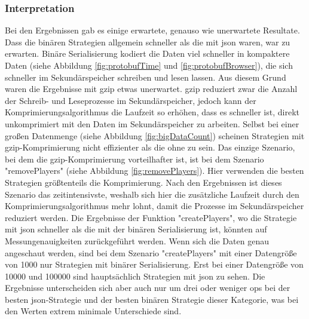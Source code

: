 \subsubsection{Interpretation}
Bei den Ergebnissen gab es einige erwartete, genauso wie unerwartete Resultate. Dass die binären Strategien allgemein schneller als die mit \ac{json} waren, war zu erwarten. Binäre Serialisierung kodiert die Daten viel schneller in kompaktere Daten (siehe Abbildung \ref{fig:protobufTime} und \ref{fig:protobufBrowser}), die sich schneller im Sekundärspeicher schreiben und lesen lassen. Aus diesem Grund waren die Ergebnisse mit \ac{gzip} etwas unerwartet. \ac{gzip} reduziert zwar die Anzahl der Schreib- und Leseprozesse im Sekundärspeicher, jedoch kann der Komprimierungsalgorithmus die Laufzeit so erhöhen, dass es schneller ist, direkt unkomprimiert mit den Daten im Sekundärspeicher zu arbeiten. Selbst bei einer großen Datenmenge (siehe Abbildung \ref{fig:bigDataCount}) scheinen Strategien mit \ac{gzip}-Komprimierung nicht effizienter als die ohne zu sein. Das einzige Szenario, bei dem die \ac{gzip}-Komprimierung vorteilhafter ist, ist bei dem Szenario "removePlayers" (siehe Abbildung \ref{fig:removePlayers}). Hier verwenden die besten Strategien größtenteils die Komprimierung. Nach den Ergebnissen ist dieses Szenario das zeitintensivste, weshalb sich hier die zusätzliche Laufzeit durch den Komprimierungsalgorithmus mehr lohnt, damit die Prozesse im Sekundärspeicher reduziert werden. Die Ergebnisse der Funktion "createPlayers", wo die Strategie mit \ac{json} schneller als die mit der binären Serialisierung ist, könnten auf Messungenauigkeiten zurückgeführt werden. Wenn sich die Daten genau angeschaut werden, sind bei dem Szenario "createPlayers" mit einer Datengröße von 1000 nur Strategien mit binärer Serialisierung. Erst bei einer Datengröße von 10000 und 100000 sind hauptsächlich Strategien mit \ac{json} zu sehen. Die Ergebnisse unterscheiden sich aber auch nur um drei oder weniger \ac{ops} bei der besten \ac{json}-Strategie und der besten binären Strategie dieser Kategorie, was bei den Werten extrem minimale Unterschiede sind.

